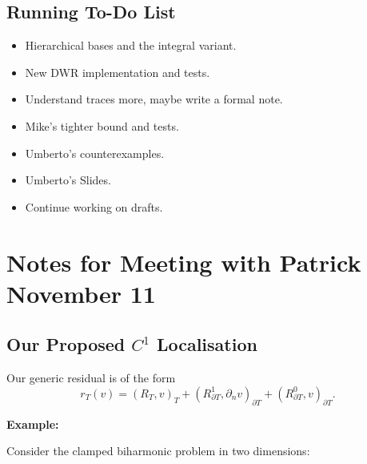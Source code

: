 \documentclass[12pt,a4paper]{article}
\newcommand{\dn}{\partial_n}
\newcommand{\Rone}{R_{\partial T}^{1}}
\newcommand{\Rzero}{R_{\partial T}^{0}}
\begin{document}
\subsection{Running To-Do List}

\begin{itemize}
    \item Hierarchical bases and the integral variant.
    \item New DWR implementation and tests. 
    \item Understand traces more, maybe write a formal note. 
    \item Mike's tighter bound and tests.
    \item Umberto's counterexamples.
    \item Umberto's Slides.
    \item Continue working on drafts. 
\end{itemize}

\newpage 
\section{Notes for Meeting with Patrick November 11}

\subsection{Our Proposed $C^1$ Localisation}


Our generic residual is of the form
\begin{equation}
    r_T(v)
    =(R_T,v)_T
      +(\Rone,\dn v)_{\partial T}
      +(\Rzero,v)_{\partial T}.
\end{equation}

\textbf{Example:}

Consider the clamped biharmonic problem in two dimensions:
\end{document}
